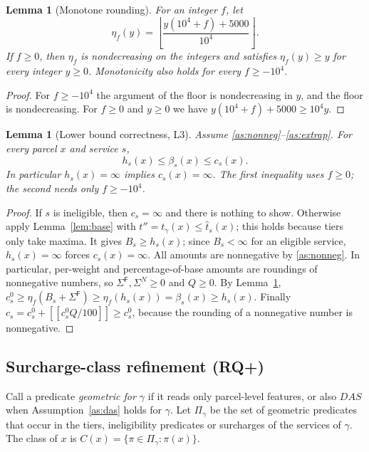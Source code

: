 \documentclass[11pt]{article}
\newtheorem{lemma}[theorem]{Lemma}
\theoremstyle{definition}
\theoremstyle{remark}
\newcommand{\fl}[1]{\left\lfloor #1 \right\rfloor}
\newcommand{\Fu}{\mathsf{F}}
\newcommand{\rnd}[1]{\llbracket #1 \rrbracket}
\providecommand{\llbracket}{[\![}
\providecommand{\rrbracket}{]\!]}
\begin{document}
\begin{lemma}[Monotone rounding]\label{lem:round}
For an integer $f$, let
\[
\eta_f(y)=\fl{\frac{y(10^4+f)+5000}{10^4}}.
\]
If $f\ge0$, then $\eta_f$ is nondecreasing on the integers and satisfies $\eta_f(y)\ge y$ for every integer $y\ge0$. Monotonicity also holds
for every $f\ge-10^4$.
\end{lemma}
\begin{proof}
For $f\ge-10^4$ the argument of the floor is nondecreasing in $y$, and the floor is
nondecreasing. For $f\ge0$ and $y\ge0$ we have $y(10^4+f)+5000\ge 10^4y$.
\end{proof}

\begin{lemma}[Lower bound correctness, L3]\label{lem:L3}
Assume \ref{as:nonneg}--\ref{as:extrap}. For every parcel $x$ and service $s$,
\[
h_s(x)\le\beta_s(x)\le c_s(x).
\]
In particular $h_s(x)=\infty$ implies $c_s(x)=\infty$. The first inequality uses $f\ge0$;
the second needs only $f\ge-10^4$.
\end{lemma}
\begin{proof}
If $s$ is ineligible, then $c_s=\infty$ and there is nothing to show. Otherwise apply Lemma~\ref{lem:base} with $t''=t_\gamma(x)\le\hat t_s(x)$;
this holds because tiers only take maxima. It gives $B_s\ge h_s(x)$; since $B_s<\infty$ for an
eligible service, $h_s(x)=\infty$ forces $c_s(x)=\infty$. All amounts are
nonnegative by \ref{as:nonneg}. In particular, per-weight and percentage-of-base amounts
are roundings of nonnegative numbers, so $\Sigma^\Fu,\Sigma^N\ge0$ and $Q\ge0$. By
Lemma~\ref{lem:round},
$c^0_s\ge\eta_f(B_s+\Sigma^\Fu)\ge\eta_f(h_s(x))=\beta_s(x)\ge h_s(x)$. Finally
$c_s=c^0_s+\rnd{c^0_sQ/100}\ge c^0_s$, because the rounding of a nonnegative number is
nonnegative.
\end{proof}

\subsection{Surcharge-class refinement (RQ+)}
Call a predicate \emph{geometric for $\gamma$} if it reads only parcel-level features,
or also $\mathit{DAS}$ when Assumption~\ref{as:das} holds for $\gamma$. Let $\Pi_\gamma$ be the
set of geometric predicates that occur in the tiers, ineligibility predicates or
surcharges of the services of $\gamma$. The class of $x$ is
$C(x)=\{\pi\in\Pi_\gamma:\pi(x)\}$.
\end{document}
